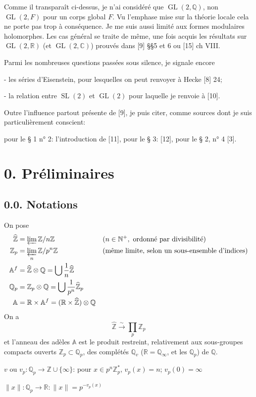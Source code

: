 \documentclass[10pt,a4paper]{article}
\providecommand{\GL}{\operatorname{GL}}
\providecommand{\SL}{\operatorname{SL}}
\providecommand{\R}{\mathbb R}
\providecommand{\Q}{\mathbb Q}
\providecommand{\Z}{\mathbb Z}
\providecommand{\C}{\mathbb C}
\providecommand{\A}{\mathbb A}
\begin{document}
Comme il transparaît ci-dessus, je n'ai considéré que $\GL(2,\Q)$, non $\GL(2,F)$ pour un corps global $F$. Vu l'emphase mise sur la théorie locale cela ne porte pas trop à conséquence. Je me suis aussi limité aux formes modulaires holomorphes. Les cas général se traite de même, une fois acquis les résultats sur $\GL(2,\R)$ (et $\GL(2,\C)$) prouvés dans [9] §§5 et 6 ou [15] ch VIII.

Parmi les nombreuses questions passées sous silence, je signale encore

\noindent - les séries d'Eisenstein, pour lesquelles on peut renvoyer à Hecke [8] 24;

\noindent - la relation entre $\SL(2)$ et $\GL(2)$ pour laquelle je renvoie à [10].

Outre l'influence partout présente de [9], je puis citer, comme sources dont je suis particulièrement conscient:

pour le § 1 n° 2: l'introduction de [11], pour le § 3: [12], pour le § 2, n° 4 [3].

\clearpage
{}
\hypertarget{authority-4}{}
\section*{0. Préliminaires}
\subsection*{0.0. Notations}
On pose
\[
\begin{aligned}
\widehat{\Z}&=\varprojlim\Z/n\Z &&(n\in\mathbb N^+,\text{ ordonné par divisibilité})\\
\Z_p&=\varprojlim_n\Z/p^n\Z &&\text{(même limite, selon un sous-ensemble d'indices)}\\
\A^f&=\widehat{\Z}\otimes\Q=\bigcup\frac1n\widehat{\Z}\\
\Q_p&=\Z_p\otimes\Q=\bigcup\frac1{p^n}\widehat{\Z}_p\\
\A&=\R\times\A^f=(\R\times\widehat{\Z})\otimes\Q
\end{aligned}
\]
On a
\[
\widehat{\Z}\xrightarrow{\sim}\prod_p\Z_p
\]
et l'anneau des adèles $\A$ est le produit restreint, relativement aux sous-groupes compacts ouverts $\Z_p\subset\Q_p$, des complétés $\Q_v$ ($\R=\Q_\infty$, et les $\Q_p$) de $\Q$.

\noindent $v$ ou $v_p:\Q_p\longrightarrow\Z\cup\{\infty\}$: pour $x\in p^n\Z_p^*$, $v_p(x)=n$; $v_p(0)=\infty$

\noindent $\|x\|:\Q_p\longrightarrow\R:\|x\|=p^{-v_p(x)}$
\end{document}
